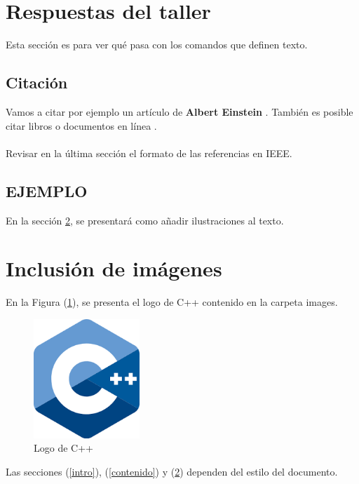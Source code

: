 \documentclass{article}
\begin{document}
\section{Respuestas del taller} \label{respuestas}
    Esta sección es para ver qué pasa con los comandos que definen texto.

\subsection{Citación}
    Vamos a citar por ejemplo un artículo de \textbf{Albert Einstein} \cite{einstein}.
    También es posible citar libros \cite{dirac} o documentos en línea \cite{knuthwebsite}.\\\\
    Revisar en la última sección el formato de las referencias en IEEE.

\subsection{EJEMPLO}


En la sección \ref{imagenes}, se presentará como añadir ilustraciones al texto.

\section{Inclusión de imágenes} \label{imagenes}

En la Figura (\ref{fig:cpplogo}), se presenta el logo de C++ contenido en la carpeta images.

\begin{figure}[H]
\includegraphics[width=4cm]{cpplogo.png}
\centering
\caption{Logo de C++}
\label{fig:cpplogo}
\end{figure}

Las secciones (\ref{intro}), (\ref{contenido}) y (\ref{imagenes}) dependen del estilo del documento.



\end{document}
